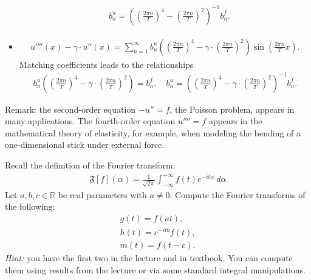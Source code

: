 \documentclass[11pt]{article}
\begin{document}
\begin{solution}
\begin{itemize}
\begin{align*}
        \quad 
        b_{n}^{u} = \left( \left( \frac{2\pi n}{T} \right)^{4} - \left( \frac{2\pi n}{T} \right)^{2} \right)^{-1} b_{n}^{f}.
     \end{align*}
     \item 
     \begin{align*}
        u''''(x) - \gamma \cdot u''(x) = \sum_{n=1}^{\infty} b_{n}^{u} \left( \left( \frac{2\pi n}{T} \right)^{4} - \gamma \cdot \left( \frac{2\pi n}{T} \right)^{2} \right) \sin\left( \frac{2\pi n}{T} x \right).
     \end{align*}
     Matching coefficients leads to the relationships
     \begin{align*}
        b_{n}^{u} \left( \left( \frac{2\pi n}{T} \right)^{4} - \gamma \cdot \left( \frac{2\pi n}{T} \right)^{2} \right) = b_{n}^{f},
        \quad 
        b_{n}^{u} = \left( \left( \frac{2\pi n}{T} \right)^{4} - \gamma \cdot \left( \frac{2\pi n}{T} \right)^{2} \right)^{-1} b_{n}^{f}.
     \end{align*}
    \end{itemize}
    Remark: the second-order equation $-u'' = f$, the Poisson problem, appears in many applications. The fourth-order equation $u'''' = f$ appears in the mathematical theory of elasticity, for example, when modeling the bending of a one-dimensional stick under external force. 
\end{solution}





\begin{exercise}
    Recall the definition of the Fourier transform:
    \begin{align}
        \mathfrak{F}[f](\alpha) = \frac{1}{\sqrt{2\pi}} \int_{-\infty}^{+\infty} f(t) e^{-it\alpha} \ d\alpha
    \end{align}
    Let $a,b,c \in \mathbb R$ be real parameters with $a \neq 0$. Compute the Fourier transforms of the following:
    \begin{align}
        g(t) = f( a t ),
        \\
        h(t) = e^{-i t b} f(t),
        \\
        m(t) = f( t - c ).
    \end{align}
    \textit{Hint: } you have the first two in the lecture and in textbook. You can compute them using results from the lecture or via some standard integral manipulations. 
\end{exercise}
\end{document}
